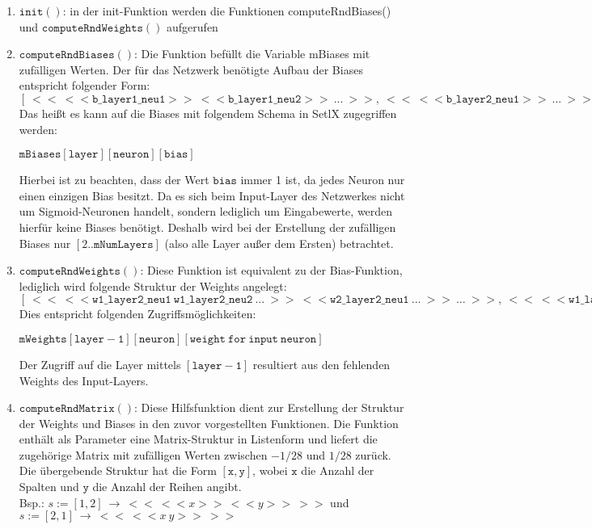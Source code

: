 \begin{enumerate}
\item $\mathtt{init()}$: in der init-Funktion werden die Funktionen computeRndBiases() und $\mathtt{computeRndWeights()}$ aufgerufen
\item $\mathtt{computeRndBiases()}$: Die Funktion befüllt die Variable mBiases mit zufälligen Werten. Der für das Netzwerk benötigte Aufbau der Biases entspricht folgender Form: \\
$[\ <<\ <<\mathtt{b\_layer1\_neu1}>>\ <<\mathtt{b\_layer1\_neu2}>>\ ...\ >>,\ <<\ <<\mathtt{b\_layer2\_neu1}>>\ ...\ >>,\ ...\ ]$ \\
Das heißt es kann auf die Biases mit folgendem Schema in SetlX zugegriffen werden: \\
\begin{center}
	$\mathtt{mBiases[layer][neuron][bias]}$
\end{center}
Hierbei ist zu beachten, dass der Wert $\mathtt{bias}$ immer 1 ist, da jedes Neuron nur einen einzigen Bias besitzt. Da es sich beim Input-Layer des Netzwerkes nicht um Sigmoid-Neuronen handelt, sondern lediglich um Eingabewerte, werden hierfür keine Biases benötigt. Deshalb wird bei der Erstellung der zufälligen Biases nur $[2..\mathtt{mNumLayers}]$ (also alle Layer außer dem Ersten) betrachtet.
\item $\mathtt{computeRndWeights()}$: Diese Funktion ist equivalent zu der Bias-Funktion, lediglich wird folgende Struktur der Weights angelegt: \\
$[\ <<\ <<\mathtt{w1\_layer2\_neu1}\ \mathtt{w1\_layer2\_neu2}\ ...\ >>\ << \mathtt{w2\_layer2\_neu1}\ ...\ >>\ ...\ >>,\ <<\ <<\mathtt{w1\_layer3\_neu1}\  \mathtt{w1\_layer3\_neu2}\ ...\ >>\ <<\mathtt{w2\_layer3\_neu1}\ ...\ >>\ ...\ >>,\ ...\ ]$ \\
Dies entspricht folgenden Zugriffsmöglichkeiten: \\ 
\begin{center}
	$\mathtt{mWeights[layer-1][neuron][weight\ for\ input\ neuron]}$
\end{center}
Der Zugriff auf die Layer mittels $\mathtt{[layer-1]}$ resultiert aus den fehlenden Weights des Input-Layers.
\item $\mathtt{computeRndMatrix()}$: Diese Hilfsfunktion dient zur Erstellung der Struktur der Weights und Biases in den zuvor vorgestellten Funktionen. Die Funktion enthält als Parameter eine Matrix-Struktur in Listenform und liefert die zugehörige Matrix mit zufälligen Werten zwischen $-1/28$ und $1/28$ zurück. Die übergebende Struktur hat die Form $\mathtt{[x,y]}$, wobei $\mathtt{x}$ die Anzahl der Spalten und $\mathtt{y}$ die Anzahl der Reihen angibt. \\
Bsp.: $s := [1,2]\ \rightarrow\ <<\ <<x>>\ <<y>>\ >>$ und $s := [2,1]\ \rightarrow\ <<\ <<x\ y>>\ >>$
\end{enumerate}


